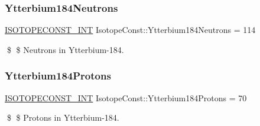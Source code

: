 \subsubsection{\texorpdfstring{Ytterbium184\+Neutrons}{Ytterbium184Neutrons}}
{\footnotesize\ttfamily \mbox{\hyperlink{group___isotope_const-_macros_ga5f18360b3e99483a35c32d789e62621c}{I\+S\+O\+T\+O\+P\+E\+C\+O\+N\+S\+T\+\_\+\+I\+NT}} Isotope\+Const\+::\+Ytterbium184\+Neutrons = 114}

\$ \$ Neutrons in Ytterbium-\/184. \mbox{\label{group___isotope_const-_ytterbium-_yb184_ga2e835e5ea41173a1d2745b9c27283096}} 
\subsubsection{\texorpdfstring{Ytterbium184\+Protons}{Ytterbium184Protons}}
{\footnotesize\ttfamily \mbox{\hyperlink{group___isotope_const-_macros_ga5f18360b3e99483a35c32d789e62621c}{I\+S\+O\+T\+O\+P\+E\+C\+O\+N\+S\+T\+\_\+\+I\+NT}} Isotope\+Const\+::\+Ytterbium184\+Protons = 70}

\$ \$ Protons in Ytterbium-\/184. 